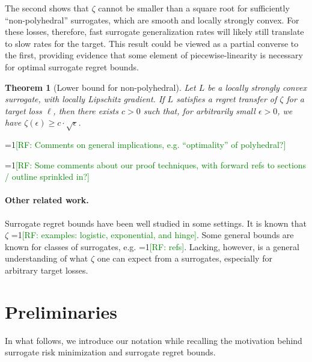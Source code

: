 \documentclass{article}
\newtheorem{theorem}{Theorem}
\theoremstyle{definition}\newtheorem{definition}{Definition}
\theoremstyle{definition}\newtheorem{assumption}{Assumption}
\newcommand{\Comments}{1}
\newcommand{\mynote}[2]{\ifnum\Comments=1\textcolor{#1}{#2}\fi}
\newcommand{\raf}[1]{\mynote{green}{[RF: #1]}}
\begin{document}
The second shows that $\zeta$ cannot be smaller than a square root for sufficiently ``non-polyhedral'' surrogates, which are smooth and locally strongly convex.
For these losses, therefore, fast surrogate generalization rates will likely still translate to slow rates for the target.
This result could be viewed as a partial converse to the first, providing evidence that some element of piecewise-linearity is necessary for optimal surrogate regret bounds.
\begin{theorem}[Lower bound for non-polyhedral]
  \label{thm:main-lower}
  Let $L$ be a locally strongly convex surrogate, with locally Lipschitz gradient.
  If $L$ satisfies a regret transfer of $\zeta$ for a target loss $\ell$, then there exists $c>0$ such that, for arbitrarily small $\epsilon>0$, we have $\zeta(\epsilon) \geq c\cdot\sqrt{\epsilon}$.
\end{theorem}
\raf{Comments on general implications, e.g. ``optimality'' of polyhedral?}

\raf{Some comments about our proof techniques, with forward refs to sections / outline sprinkled in?}


\paragraph{Other related work.}
Surrogate regret bounds have been well studied in some settings.
It is known that $\zeta$ \raf{examples: logistic, exponential, and hinge}.
Some general bounds are known for classes of surrogates, e.g. \raf{refs}.
Lacking, however, is a general understanding of what $\zeta$ one can expect from a surrogates, especially for arbitrary target losses.


\section{Preliminaries}

In what follows, we introduce our notation while recalling the motivation behind surrogate risk minimization and surrogate regret bounds.
\end{document}
